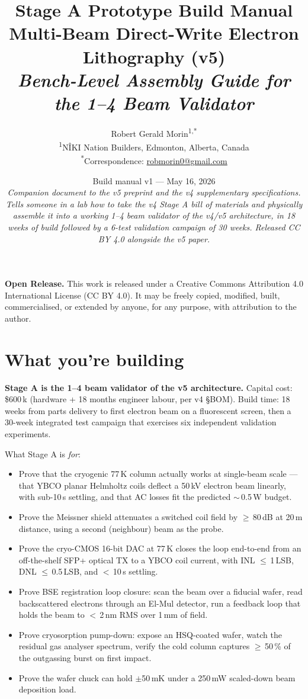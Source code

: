 \documentclass[11pt,letterpaper]{article}
\title{\Large \textbf{Stage A Prototype Build Manual}\\[0.3em]
  \large Multi-Beam Direct-Write Electron Lithography (v5)\\[0.2em]
  \normalsize \textit{Bench-Level Assembly Guide for the 1--4 Beam Validator}}
\author{Robert Gerald Morin\textsuperscript{1,*}\\[0.4em]
  {\small \textsuperscript{1}N\^{I}KI Nation Builders, Edmonton, Alberta, Canada}\\
  {\small \textsuperscript{*}Correspondence: \href{mailto:robmorin0@gmail.com}{robmorin0@gmail.com}}}
\date{Build manual v1 --- May 16, 2026\\[0.3em]
  {\small\textit{Companion document to the v5 preprint and the v4 supplementary
  specifications. Tells someone in a lab how to take the v4 Stage A bill of
  materials and physically assemble it into a working 1--4 beam validator of
  the v4/v5 architecture, in 18 weeks of build followed by a 6-test
  validation campaign of 30 weeks. Released CC BY 4.0 alongside the v5
  paper.}}}
\begin{document}
\maketitle
\thispagestyle{fancy}

\begin{mdframed}[linewidth=0.5pt,backgroundcolor=gray!4]
\textbf{Open Release.} This work is released under a Creative Commons Attribution 4.0 International License (CC BY 4.0). It may be freely copied, modified, built, commercialised, or extended by anyone, for any purpose, with attribution to the author.
\end{mdframed}

\section{What you're building}

\textbf{Stage A is the 1--4 beam validator of the v5 architecture.} Capital cost: \$600\,k (hardware + 18 months engineer labour, per v4 \S BOM). Build time: 18 weeks from parts delivery to first electron beam on a fluorescent screen, then a 30-week integrated test campaign that exercises six independent validation experiments.

What Stage A is \textit{for}:

\begin{itemize}[leftmargin=1.6em]
  \item Prove that the cryogenic 77\,K column actually works at single-beam scale --- that YBCO planar Helmholtz coils deflect a 50\,kV electron beam linearly, with sub-10\,\textmu s settling, and that AC losses fit the predicted $\sim$\,0.5\,W budget.
  \item Prove the Meissner shield attenuates a switched coil field by $\geq$\,80\,dB at 20\,\textmu m distance, using a second (neighbour) beam as the probe.
  \item Prove the cryo-CMOS 16-bit DAC at 77\,K closes the loop end-to-end from an off-the-shelf SFP+ optical TX to a YBCO coil current, with INL $\leq$\,1\,LSB, DNL $\leq$\,0.5\,LSB, and $<$\,10\,\textmu s settling.
  \item Prove BSE registration loop closure: scan the beam over a fiducial wafer, read backscattered electrons through an El-Mul detector, run a feedback loop that holds the beam to $<$\,2\,nm RMS over 1\,mm of field.
  \item Prove cryosorption pump-down: expose an HSQ-coated wafer, watch the residual gas analyser spectrum, verify the cold column captures $\geq$\,50\,\% of the outgassing burst on first impact.
  \item Prove the wafer chuck can hold $\pm$50\,mK under a 250\,mW scaled-down beam deposition load.
\end{itemize}
\end{document}
